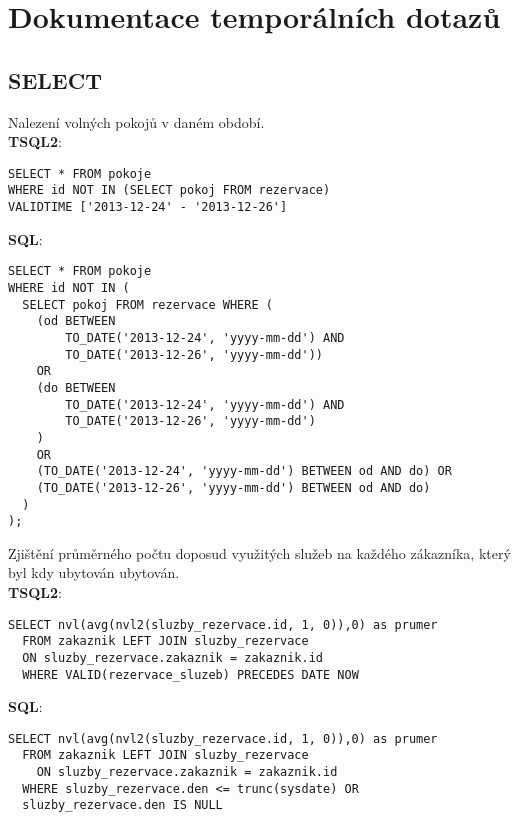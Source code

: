 \documentclass[8pt,a4paper]{article}
\begin{document}
\section{Dokumentace temporálních dotazů}
\subsection{SELECT}

Nalezení volných pokojů v daném období.\\

\textbf{TSQL2}:
\begin{center}
\begin{verbatim}
SELECT * FROM pokoje
WHERE id NOT IN (SELECT pokoj FROM rezervace)
VALIDTIME ['2013-12-24' - '2013-12-26']
\end{verbatim}
\end{center}

\textbf{SQL}:
\begin{center}
\begin{verbatim}
SELECT * FROM pokoje 
WHERE id NOT IN (
  SELECT pokoj FROM rezervace WHERE (
    (od BETWEEN 
        TO_DATE('2013-12-24', 'yyyy-mm-dd') AND
        TO_DATE('2013-12-26', 'yyyy-mm-dd'))
    OR
    (do BETWEEN
        TO_DATE('2013-12-24', 'yyyy-mm-dd') AND
        TO_DATE('2013-12-26', 'yyyy-mm-dd')
    )
    OR
    (TO_DATE('2013-12-24', 'yyyy-mm-dd') BETWEEN od AND do) OR
    (TO_DATE('2013-12-26', 'yyyy-mm-dd') BETWEEN od AND do)
  )
);
\end{verbatim}
\end{center}


Zjištění průměrného počtu doposud využitých služeb na každého zákazníka, který byl kdy ubytován ubytován.\\

\textbf{TSQL2}:
\begin{center}
\begin{verbatim}
SELECT nvl(avg(nvl2(sluzby_rezervace.id, 1, 0)),0) as prumer
  FROM zakaznik LEFT JOIN sluzby_rezervace 
  ON sluzby_rezervace.zakaznik = zakaznik.id
  WHERE VALID(rezervace_sluzeb) PRECEDES DATE NOW
\end{verbatim}
\end{center}

\textbf{SQL}:
\begin{center}
\begin{verbatim}
SELECT nvl(avg(nvl2(sluzby_rezervace.id, 1, 0)),0) as prumer
  FROM zakaznik LEFT JOIN sluzby_rezervace 
    ON sluzby_rezervace.zakaznik = zakaznik.id
  WHERE sluzby_rezervace.den <= trunc(sysdate) OR
  sluzby_rezervace.den IS NULL
\end{verbatim}
\end{center}
\end{document}
